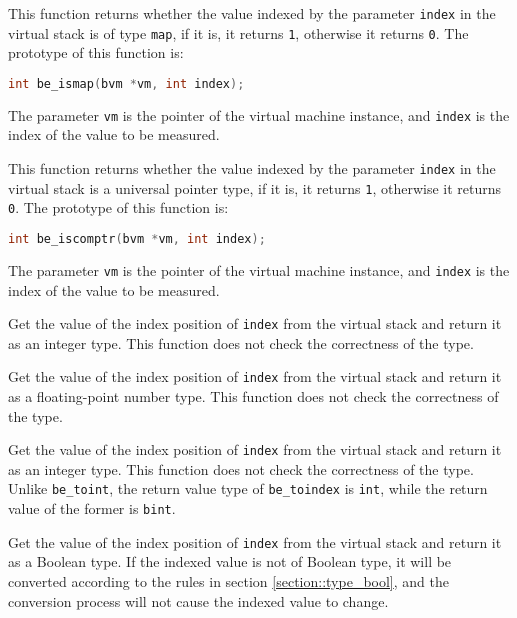 
This function returns whether the value indexed by the parameter \texttt{index} in the virtual stack is of type \texttt{map}, if it is, it returns \texttt{1}, otherwise it returns \texttt{0}. The prototype of this function is:
\begin{lstlisting}[language=c, style=berry, numbers=none]
int be_ismap(bvm *vm, int index);
\end{lstlisting}
The parameter \texttt{vm} is the pointer of the virtual machine instance, and \texttt{index} is the index of the value to be measured.


This function returns whether the value indexed by the parameter \texttt{index} in the virtual stack is a universal pointer type, if it is, it returns \texttt{1}, otherwise it returns \texttt{0}. The prototype of this function is:
\begin{lstlisting}[language=c, style=berry, numbers=none]
int be_iscomptr(bvm *vm, int index);
\end{lstlisting}
The parameter \texttt{vm} is the pointer of the virtual machine instance, and \texttt{index} is the index of the value to be measured.


Get the value of the index position of \texttt{index} from the virtual stack and return it as an integer type. This function does not check the correctness of the type.


Get the value of the index position of \texttt{index} from the virtual stack and return it as a floating-point number type. This function does not check the correctness of the type.


Get the value of the index position of \texttt{index} from the virtual stack and return it as an integer type. This function does not check the correctness of the type. Unlike \texttt{be\_toint}, the return value type of \texttt{be\_toindex} is \texttt{int}, while the return value of the former is \texttt{bint}.


Get the value of the index position of \texttt{index} from the virtual stack and return it as a Boolean type. If the indexed value is not of Boolean type, it will be converted according to the rules in section \ref{section::type_bool}, and the conversion process will not cause the indexed value to change.

